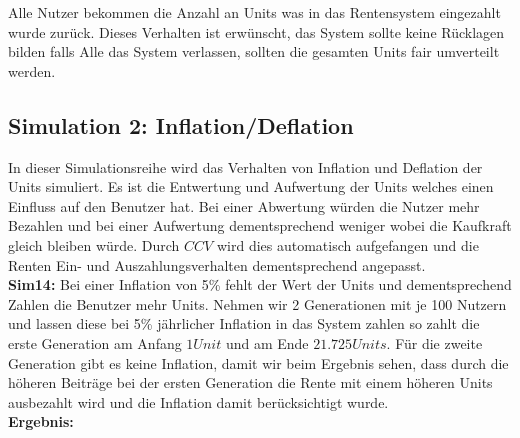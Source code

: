 Alle Nutzer bekommen die Anzahl an Units was in das Rentensystem eingezahlt wurde zurück. Dieses Verhalten ist erwünscht, das System sollte keine Rücklagen bilden falls Alle das System verlassen, sollten die gesamten Units fair umverteilt werden.

\subsection{Simulation 2: Inflation/Deflation}

In dieser Simulationsreihe wird das Verhalten von Inflation und Deflation der Units simuliert. Es ist die Entwertung und Aufwertung der Units welches einen Einfluss auf den Benutzer hat. Bei einer Abwertung würden die Nutzer mehr Bezahlen und bei einer Aufwertung dementsprechend weniger wobei die Kaufkraft gleich bleiben würde. Durch $CCV$ wird dies automatisch aufgefangen und die Renten Ein- und Auszahlungsverhalten dementsprechend angepasst. \\

\textbf{Sim14:} Bei einer Inflation von 5\% fehlt der Wert der Units und dementsprechend Zahlen die Benutzer mehr Units. Nehmen wir 2 Generationen mit je 100 Nutzern und lassen diese bei 5\% jährlicher Inflation in das System zahlen so zahlt die erste Generation am Anfang $1 Unit$  und am Ende $21.725 Units$. Für die zweite Generation gibt es keine Inflation, damit wir beim Ergebnis sehen, dass durch die höheren Beiträge bei der ersten Generation die Rente mit einem höheren Units ausbezahlt wird und die Inflation damit berücksichtigt wurde. \\

\textbf{Ergebnis:}

\begin{table}[hbt!]
\centering
{}
\end{table}

